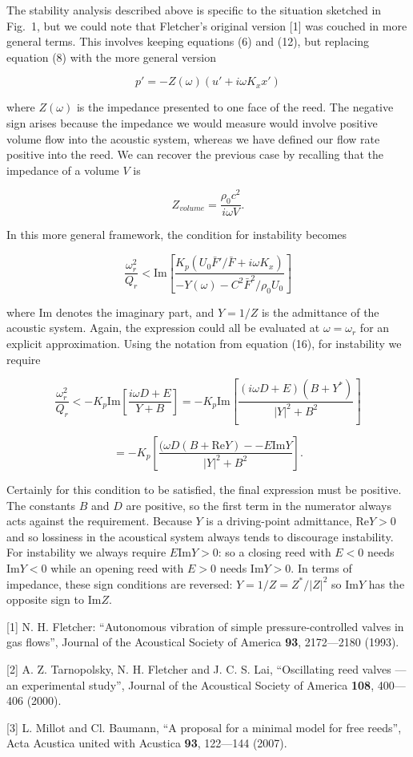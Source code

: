   The stability analysis described above is specific to the situation sketched 
  in Fig.\ 1, but we could note that Fletcher's original version [1] was 
  couched in more general terms. This involves keeping equations (6) and (12), 
  but replacing equation (8) with the more general version 

  $$p'=-Z(\omega) \left(u'+i \omega K_x x' \right) \tag{20}$$ 

  where $Z(\omega)$ is the impedance presented to one face of the reed. The 
  negative sign arises because the impedance we would measure would involve 
  positive volume flow into the acoustic system, whereas we have defined our 
  flow rate positive into the reed. We can recover the previous case by 
  recalling that the impedance of a volume $V$ is 

  $$Z_{volume}=\dfrac{\rho_0 c^2}{i \omega V}. \tag{21}$$ 

  In this more general framework, the condition for instability becomes 

  $$\dfrac{\omega_r^2}{Q_r} < \mathrm{Im}\left[\dfrac{K_p(U_0 \bar{F}'/\bar{F} 
  + i \omega K_x)}{-Y(\omega)-C^2 \bar{F}^2/\rho_0 U_0}\right] \tag{22}$$ 

  where $\mathrm{Im}$ denotes the imaginary part, and $Y=1/Z$ is the admittance 
  of the acoustic system. Again, the expression could all be evaluated at 
  $\omega=\omega_r$ for an explicit approximation. Using the notation from 
  equation (16), for instability we require 

  $$\dfrac{\omega_r^2}{Q_r} <-K_p \mathrm{Im} \left[ \dfrac{i \omega D + E}{Y 
  +B}\right]=-K_p\mathrm{Im} \left[\dfrac{(i \omega D + 
  E)(B+Y^*)}{|Y|^2+B^2}\right]$$ 

  $$=-K_p\left[\dfrac{(\omega D (B+\mathrm{Re} Y) -- E \mathrm{Im} 
  Y}{|Y|^2+B^2}\right] . \tag{23}$$ 

  Certainly for this condition to be satisfied, the final expression must be 
  positive. The constants $B$ and $D$ are positive, so the first term in the 
  numerator always acts against the requirement. Because $Y$ is a driving-point 
  admittance, $\mathrm{Re} Y > 0$ and so lossiness in the acoustical system 
  always tends to discourage instability. For instability we always require 
  $E\mathrm{Im} Y > 0$: so a closing reed with $E<0$ needs $\mathrm{Im} Y<0$ 
  while an opening reed with $E>0$ needs $\mathrm{Im} Y>0$. In terms of 
  impedance, these sign conditions are reversed: $Y=1/Z=Z^*/|Z|^2$ so 
  $\mathrm{Im} Y$ has the opposite sign to $\mathrm{Im} Z$. 

  \sectionreferences{}[1] N. H. Fletcher: “Autonomous vibration of simple 
  pressure-controlled valves in gas flows”, Journal of the Acoustical Society 
  of America \textbf{93}, 2172—2180 (1993). 

  [2] A. Z. Tarnopolsky, N. H. Fletcher and J. C. S. Lai, “Oscillating reed 
  valves — an experimental study”, Journal of the Acoustical Society of America 
  \textbf{108}, 400—406 (2000). 

  [3] L. Millot and Cl. Baumann, “A proposal for a minimal model for free 
  reeds”, Acta Acustica united with Acustica \textbf{93}, 122—144 (2007). 